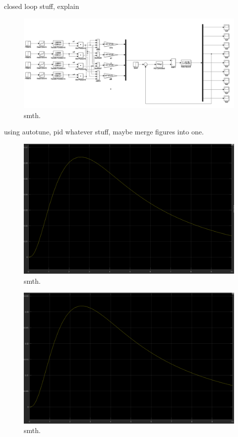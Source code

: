 closed loop stuff, explain

\begin{figure}[H]
  \centering
    \includegraphics[width=1\textwidth]{images/closedloopGx.png}
	\caption{smth.}
	\label{closedloop1}
\end{figure}

using autotune, pid whatever stuff, maybe merge figures into one.

\begin{figure}[H]
  \centering
    \includegraphics[width=1\textwidth]{images/closedloopGxstep.png}
	\caption{smth.}
	\label{closedloop2}
\end{figure}

\begin{figure}[H]
  \centering
    \includegraphics[width=1\textwidth]{images/closedloopGystep.png}
	\caption{smth.}
	\label{closedloop3}
\end{figure}

